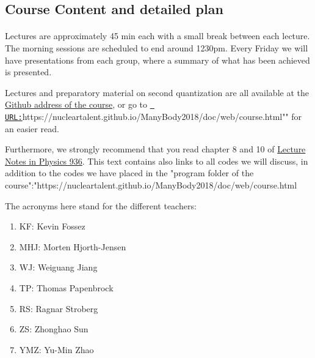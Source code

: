 \documentclass[%
oneside,                 %
final,                   %
10pt]{article}
\begin{document}
\noindent





\subsection*{Course Content and detailed plan}

\paragraph{}

Lectures are approximately 45 min each with a small break between each lecture. The morning sessions are scheduled to end around 1230pm. 
Every Friday we will have presentations from each group, where a summary of what has been achieved is presented. 

Lectures and preparatory material on second quantization are all available at the \href{{https://github.com/NuclearTalent/ManyBody2018}}{Github address of the course}, or go to \href{{URL:}}{\nolinkurl{ URL:}}https://nucleartalent.github.io/ManyBody2018/doc/web/course.html""  for an easier read. 

Furthermore, we strongly recommend that you read chapter 8 and 10 of \href{{https://www.springer.com/us/book/9783319533353}}{Lecture Notes in Physics 936}. This text contains also links to all codes we will discuss, in addition to the codes we have placed in the "program folder of the course":"https://nucleartalent.github.io/ManyBody2018/doc/web/course.html

The acronyms here stand for the different teachers:
\begin{enumerate}
\item KF: Kevin Fossez

\item MHJ: Morten Hjorth-Jensen

\item WJ: Weiguang Jiang

\item TP: Thomas Papenbrock

\item RS: Ragnar Stroberg

\item ZS: Zhonghao Sun

\item YMZ: Yu-Min Zhao
\end{enumerate}
\end{document}
